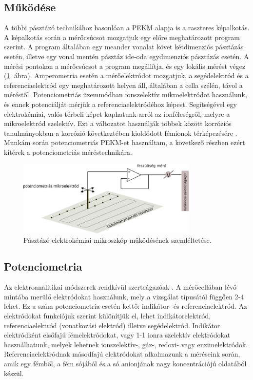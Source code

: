 \subsection{Működése}

A többi pásztázó technikához hasonlóan a PEKM alapja is a raszteres képalkotás. A képalkotás során a mérőcsúcsot mozgatjuk egy előre meghatározott program szerint. A program általában egy meander vonalat követ kétdimenziós pásztázás esetén, illetve egy vonal mentén pásztáz ide-oda egydimenziós pásztázás esetén. A mérési pontokon a mérőcsúcsot a program megállítja, és egy lokális mérést végez (\ref{fig:PEKM}. ábra). Amperometria esetén a mérőelektródot mozgatjuk, a segédelektród és a referenciaelektród egy meghatározott helyen áll, általában a cella szélén, távol a méréstől. Potenciometriás üzemmódban ionszelektív mikroelektródot használunk, és ennek potenciálját mérjük a referenciaelektródéhoz képest. Segítségével egy elektrokémiai, valós térbeli képet kaphatunk arról az ionféleségről, melyre a mikroelektród szelektív. Ezt a változatot használják többek között korróziós tanulmányokban a korrózió következtében kioldódott fémionok térképezésére \cite{bastos2010micropotentiometric, lamaka2008monitoring, karavai2010localized}. Munkám során potenciometriás PEKM-et használtam, a következő részben ezért kitérek a potenciometriás méréstechnikára.
\begin{figure}
\centering
\includegraphics[width=0.8\textwidth]{img/PEKM.png}
\caption{Pásztázó elektrokémiai mikroszkóp működésének szemléltetése.}
\label{fig:PEKM}
\end{figure}


\subsection{Potenciometria} 

Az elektroanalitikai módszerek rendkívül szerteágazóak \cite{erdey1967, pfreisich1960, kissl1997}. A mérőcellában lévő mintába merülő elektródokat használunk, mely a vizsgálat típusától függően 2-4 lehet. Ez a szám potenciometria esetén kettő: indikátor- és referenciaelektród. Az elektródokat funkciójuk szerint különítjük el, lehet indikátorelektród, referenciaelektród (vonatkozási elektród) illetve segédelektród. Indikátor elektródként elsőfajú fémelektródokat, vagy 1-1 ionra szelektív elektródokat használhatunk, melyek lehetnek ionszelektív-, gáz-, redoxi- vagy enzimelektródok. Referenciaelektródnak másodfajú elektródokat alkalmazunk a méréseink során, amik egy fémből, a fém sójából és a só anionjának nagy koncentrációjú oldatából készül.

